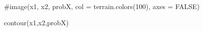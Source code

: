 \begin{Schunk}
\begin{Sinput}
 #image(x1, x2, probX, col = terrain.colors(100), axes = FALSE)
 
 contour(x1,x2,probX)
 
\end{Sinput}
\end{Schunk}
